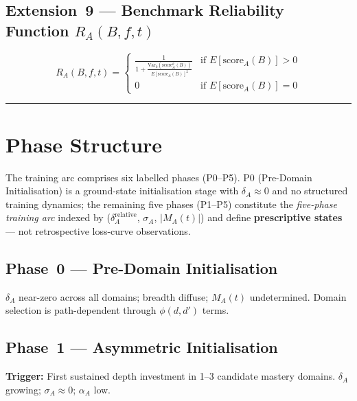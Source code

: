 \documentclass[11pt,a4paper]{article}
\begin{document}
\subsection{Extension~9 --- Benchmark Reliability Function \texorpdfstring{$R_A(B,f,t)$}{R\_A(B,f,t)}}\label{sec:reliability-fn}

\begin{equation}\label{eq:reliability}
R_A(B,f,t) = \begin{cases} \displaystyle\frac{1}{1 + \frac{\text{Var}_k(\text{score}_A^k(B))}{E[\text{score}_A(B)]^2}} & \text{if } E[\text{score}_A(B)] > 0 \\[8pt] 0 & \text{if } E[\text{score}_A(B)] = 0 \end{cases}
\end{equation}

\noindent\rule{\linewidth}{0.4pt}

\section{Phase Structure}\label{sec:phase-structure}

The training arc comprises six labelled phases (P0--P5).  P0
(Pre-Domain Initialisation) is a ground-state initialisation stage
with $\delta_A \approx 0$ and no structured training dynamics; the
remaining five phases (P1--P5) constitute the \emph{five-phase
training arc} indexed by
($\delta_A^{\text{relative}}$, $\sigma_A$, $|M_A(t)|$) and define
\textbf{prescriptive states} --- not retrospective loss-curve
observations.

\subsection*{Phase~0 --- Pre-Domain Initialisation}

$\delta_A$ near-zero across all domains; breadth diffuse; $M_A(t)$
undetermined. Domain selection is path-dependent through $\phi(d,d')$
terms.

\subsection*{Phase~1 --- Asymmetric Initialisation}

\textbf{Trigger:} First sustained depth investment in 1--3 candidate
mastery domains. $\delta_A$ growing; $\sigma_A \approx 0$; $\alpha_A$
low.
\end{document}
